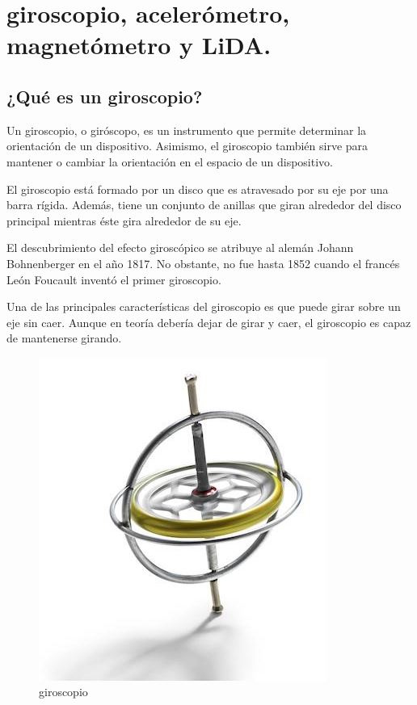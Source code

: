 \section{giroscopio, acelerómetro, magnetómetro y LiDA. }

\subsection{  ¿Qué es un giroscopio?}


Un giroscopio, o giróscopo, es un instrumento que permite determinar la orientación de un dispositivo. Asimismo, el giroscopio también sirve para mantener o cambiar la orientación en el espacio de un dispositivo.

El giroscopio está formado por un disco que es atravesado por su eje por una barra rígida. Además, tiene un conjunto de anillas que giran alrededor del disco principal mientras éste gira alrededor de su eje.

El descubrimiento del efecto giroscópico se atribuye al alemán Johann Bohnenberger en el año 1817. No obstante, no fue hasta 1852 cuando el francés León Foucault inventó el primer giroscopio.

Una de las principales características del giroscopio es que puede girar sobre un eje sin caer. Aunque en teoría debería dejar de girar y caer, el giroscopio es capaz de mantenerse girando. 

\begin{figure}[h]
	\centering
	\includegraphics[width=0.7\linewidth]{img/giroscopio.jpg}
	\caption{giroscopio}
	\label{fig:insertarimagen}
\end{figure}

